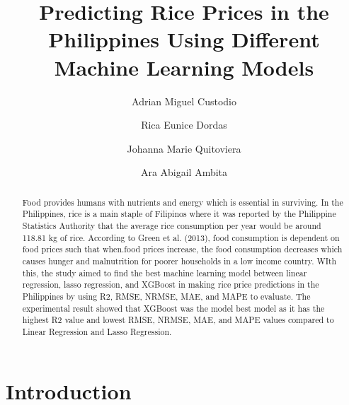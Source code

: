 \documentclass[runningheads]{llncs}
\begin{document}
	\title{Predicting Rice Prices in the Philippines Using Different Machine Learning Models
	}
	\author{Adrian Miguel Custodio \and
		Rica Eunice Dordas\and
		Johanna Marie Quitoviera\and
	Ara Abigail Ambita }
	\maketitle              %
	\begin{abstract}
	Food provides humans with nutrients and energy which is essential in surviving. In the Philippines, rice is a main staple of Filipinos where it was reported by the Philippine Statistics Authority that the average rice consumption per year would be around 118.81 kg of rice. According to Green et al. (2013), food consumption is dependent on food prices such that when.food prices increase, the food consumption decreases which causes hunger and malnutrition for poorer households in a low income country. WIth this, the study aimed to find the best machine learning model between linear regression, lasso regression, and XGBoost in making rice price predictions in the Philippines by using R2, RMSE, NRMSE, MAE, and MAPE to evaluate.  The experimental result showed that XGBoost was the model best model as it has the highest R2 value and lowest RMSE, NRMSE, MAE, and MAPE values  compared to Linear Regression and Lasso Regression. 
	
		
		
	\end{abstract}

%
%
%
\section{Introduction}
\end{document}
